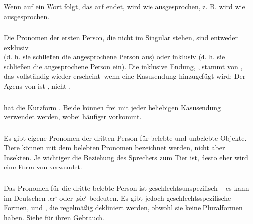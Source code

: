 Wenn  auf ein Wort folgt, das auf  endet, wird  wie  ausgesprochen, z. B. wird  wie  ausgesprochen.

\subsubsection{} Die Pronomen der ersten Person, die nicht im Singular stehen, sind entweder exklusiv\\ (d. h. sie schließen die angesprochene Person aus) oder inklusiv (d. h. sie schließen die angesprochene Person ein). Die inklusive Endung, , stammt von , das vollständig wieder erscheint, wenn eine Kasusendung hinzugefügt wird: Der Agens von  ist , nicht .

\subsubsection{}  hat die Kurzform . Beide können frei mit jeder beliebigen Kasusendung verwendet werden, wobei  häufiger vorkommt.

\subsubsection{} Es gibt eigene Pronomen der dritten Person für belebte und unbelebte Objekte. Tiere können mit dem belebten Pronomen  bezeichnet werden, nicht aber Insekten. Je wichtiger die Beziehung des Sprechers zum Tier ist, desto eher wird eine Form von  verwendet.

\subsubsection{} Das Pronomen für die dritte belebte Person  ist geschlechtsunspezifisch -- es kann im Deutschen ,er‘ oder ,sie‘ bedeuten. Es gibt jedoch geschlechtsspezifische Formen,   und  , die regelmäßig dekliniert werden, obwohl sie keine Pluralformen haben. Siehe  für ihren Gebrauch.
\label{morph:pron:gender}

